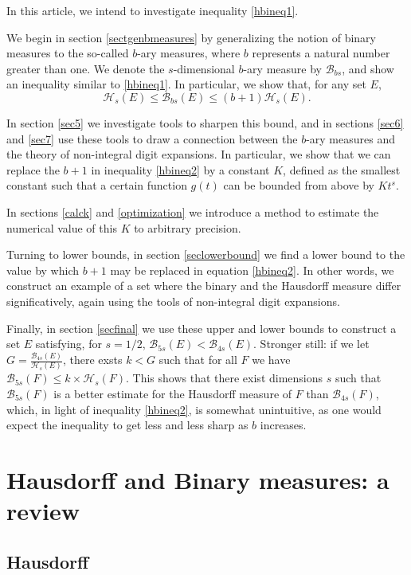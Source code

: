 \documentclass[11pt, reqno]{amsart}
\newcommand{\HH}{\mathcal{H}}
\newcommand{\BB}{\mathcal{B}}
\begin{document}
In this article, we intend to investigate inequality \eqref{hbineq1}.

We begin in section \ref{sectgenbmeasures} by generalizing the notion of binary measures to the so-called $b$-ary measures, where $b$ represents a natural number greater than one. We denote the $s$-dimensional $b$-ary measure by $\BB_{bs}$, and show an inequality similar to \eqref{hbineq1}. In particular, we show that, for any set $E$,
\begin{equation}\label{hbineq2}
\HH_s(E) \leq \BB_{bs}(E) \leq (b+1) \HH_s(E).
\end{equation}

In section \ref{sec5} we investigate tools to sharpen this bound, and in sections \ref{sec6} and \ref{sec7} use these tools to draw a connection between the $b$-ary measures and the theory of non-integral digit expansions. In particular, we show that we can replace the $b+1$ in inequality \eqref{hbineq2} by a constant $K$, defined as the smallest constant such that a certain function $g(t)$ can be bounded from above by $K t^s$.

In sections \ref{calck} and \ref{optimization} we introduce a method to estimate the numerical value of this $K$ to arbitrary precision.

Turning to lower bounds, in section \ref{seclowerbound} we find a lower bound to the value by which $b+1$ may be replaced in equation \eqref{hbineq2}. In other words, we construct an example of a set where the binary and the Hausdorff measure differ significatively, again using the tools of non-integral digit expansions.

Finally, in section \ref{secfinal} we use these upper and lower bounds to construct a set $E$ satisfying, for $s = 1/2$, $\BB_{5s}(E) < \BB_{4s}(E)$. Stronger still: if we let $G = \frac{\BB_{4s}(E)}{\HH_s(E)}$, there exsts $k < G$ such that for all $F$ we have $\BB_{5s}(F) \leq k \times \HH_s(F)$. This shows that there exist dimensions $s$ such that $\BB_{5s}(F)$ is a better estimate for the Hausdorff measure of $F$ than $\BB_{4s}(F)$, which, in light of inequality \eqref{hbineq2}, is somewhat unintuitive, as one would expect the inequality to get less and less sharp as $b$ increases.


\section{Hausdorff and Binary measures: a review}

\subsection{Hausdorff}
\end{document}
